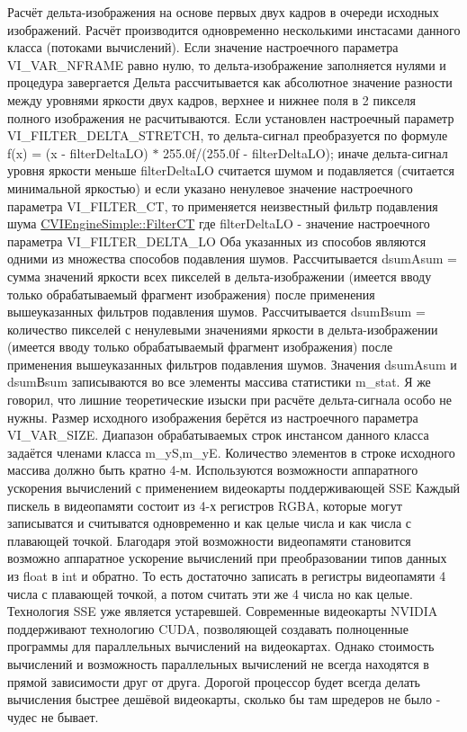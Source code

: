 Расчёт дельта-\/изображения на основе первых двух кадров в очереди исходных изображений. Расчёт производится одновременно несколькими инстасами данного класса (потоками вычислений). Если значение настроечного параметра V\+I\+\_\+\+V\+A\+R\+\_\+\+N\+F\+R\+A\+M\+E равно нулю, то дельта-\/изображение заполняется нулями и процедура завергается Дельта рассчитывается как абсолютное значение разности между уровнями яркости двух кадров, верхнее и нижнее поля в 2 пикселя полного изображения не расчитываются. Если установлен настроечный параметр V\+I\+\_\+\+F\+I\+L\+T\+E\+R\+\_\+\+D\+E\+L\+T\+A\+\_\+\+S\+T\+R\+E\+T\+C\+H, то дельта-\/сигнал преобразуется по формуле f(x) = (x -\/ filter\+Delta\+L\+O) $\ast$ 255.\+0f/(255.\+0f -\/ filter\+Delta\+L\+O); иначе дельта-\/сигнал уровня яркости меньше filter\+Delta\+L\+O считается шумом и подавляется (считается минимальной яркостью) и если указано ненулевое значение настроечного параметра V\+I\+\_\+\+F\+I\+L\+T\+E\+R\+\_\+\+C\+T, то применяется неизвестный фильтр подавления шума \hyperlink{class_c_v_i_engine_simple_a2b0441394c18c07d7d90fb13998c0355}{C\+V\+I\+Engine\+Simple\+::\+Filter\+C\+T} где filter\+Delta\+L\+O -\/ значение настроечного параметра V\+I\+\_\+\+F\+I\+L\+T\+E\+R\+\_\+\+D\+E\+L\+T\+A\+\_\+\+L\+O Оба указанных из способов являются одними из множества способов подавления шумов. Рассчитывается dsum\+Asum = сумма значений яркости всех пикселей в дельта-\/изображении (имеется вводу только обрабатываемый фрагмент изображения) после применения вышеуказанных фильтров подавления шумов. Рассчитывается dsum\+Bsum = количество пикселей с ненулевыми значениями яркости в дельта-\/изображении (имеется вводу только обрабатываемый фрагмент изображения) после применения вышеуказанных фильтров подавления шумов. Значения dsum\+Asum и dsumВsum записываются во все элементы массива статистики m\+\_\+stat. Я же говорил, что лишние теоретические изыски при расчёте дельта-\/сигнала особо не нужны. Размер исходного изображения берётся из настроечного параметра V\+I\+\_\+\+V\+A\+R\+\_\+\+S\+I\+Z\+E. Диапазон обрабатываемых строк инстансом данного класса задаётся членами класса m\+\_\+y\+S,m\+\_\+y\+E. Количество элементов в строке исходного массива должно быть кратно 4-\/м. Используются возможности аппаратного ускорения вычислений с применением видеокарты поддерживающей S\+S\+E Каждый пискель в видеопамяти состоит из 4-\/х регистров R\+G\+B\+A, которые могут записыватся и считыватся одновременно и как целые числа и как числа с плавающей точкой. Благодаря этой возможности видеопамяти становится возможно аппаратное ускорение вычислений при преобразовании типов данных из float в int и обратно. То есть достаточно записать в регистры видеопамяти 4 числа с плавающей точкой, а потом считать эти же 4 числа но как целые. Технология S\+S\+E уже является устаревшей. Современные видеокарты N\+V\+I\+D\+I\+A поддерживают технологию C\+U\+D\+A, позволяющей создавать полноценные программы для параллельных вычислений на видеокартах. Однако стоимость вычислений и возможность параллельных вычислений не всегда находятся в прямой зависимости друг от друга. Дорогой процессор будет всегда делать вычисления быстрее дешёвой видеокарты, сколько бы там шредеров не было -\/ чудес не бывает. 

